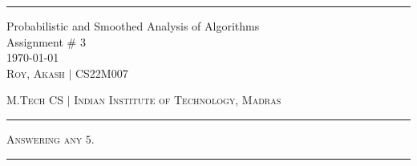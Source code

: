 \documentclass[12pt, a4paper, onecolumn]{exam}
\begin{document}
\hrule
\vspace{1em}

\begingroup
\centering
\LARGE Probabilistic and Smoothed Analysis of Algorithms\\
\LARGE Assignment \# 3\\[0.5em]
\large \today\\[0.5em]
\large \textsc{Roy, Akash} $\mid$ CS22M007\par
\large \textsc{M.Tech CS} $\mid$ \textsc{Indian Institute of Technology, Madras}\par
\endgroup
\pointsdroppedatright %
\printanswers
\renewcommand{\solutiontitle}{\noindent\textbf{Ans:}\enspace}   %

\vspace{1em}
\hrule
\vspace{0.2em}

\begin{center}
	\textsc{Answering any} $5$.
\end{center}

\vspace{0.2em}
\hrule
\vspace{1em}
\end{document}
